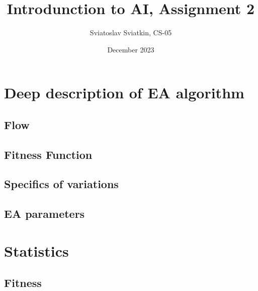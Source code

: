 \documentclass{article}
\title{Introdunction to AI, Assignment 2}
\author{Sviatoslav Sviatkin, CS-05}
\date{December 2023}
\begin{document}
\maketitle

\section*{Deep description of EA algorithm}

\subsection*{Flow}

\subsection*{Fitness Function}

\subsection*{Specifics of variations}

\subsection*{EA parameters}

\section*{Statistics}

\subsection*{Fitness}
\end{document}
